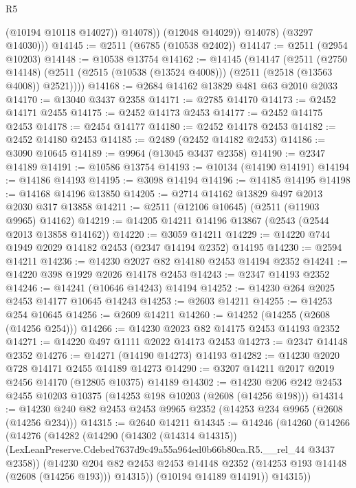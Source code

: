 \begin{lexlean}{R5}
\begin{coremodule}
                  (@10194 @10118 @14027))
                @14078))
            (@12048 @14029))
          @14078)
        (@3297 @14030)))
@14145 := @2511 (@6785 (@10538 @2402))
@14147 := @2511 (@2954 @10203)
@14148 := @10538 @13754
@14162 := @14145
    (@14147
      (@2511
        (@2750 @14148)
        (@2511 (@2515 (@10538 (@13524 @4008))) (@2511 (@2518 (@13563 @4008)) @2521))))
@14168 := @2684 @14162 @13829 @481 @63 @2010 @2033
@14170 := @13040 @3437 @2358
@14171 := @2785 @14170
@14173 := @2452 @14171 @2455
@14175 := @2452 @14173 @2453
@14177 := @2452 @14175 @2453
@14178 := @2454 @14177
@14180 := @2452 @14178 @2453
@14182 := @2452 @14180 @2453
@14185 := @2489 (@2452 @14182 @2453)
@14186 := @3090 @10645
@14189 := @9964 (@13045 @3437 @2358)
@14190 := @2347 @14189
@14191 := @10586 @13754
@14193 := @10134 (@14190 @14191)
@14194 := @14186 @14193
@14195 := @3098 @14194
@14196 := @14185 @14195
@14198 := @14168 @14196 @13850
@14205 := @2714 @14162 @13829 @497 @2013 @2030 @317 @13858
@14211 := @2511 (@12106 @10645) (@2511 (@11903 @9965) @14162)
@14219 := @14205 @14211 @14196 @13867 (@2543 (@2544 @2013 @13858 @14162))
@14220 := @3059 @14211
@14229 := @14220 @744 @1949 @2029 @14182 @2453 (@2347 @14194 @2352) @14195
@14230 := @2594 @14211
@14236 := @14230 @2027 @82 @14180 @2453 @14194 @2352
@14241 := @14220 @398 @1929 @2026 @14178 @2453
@14243 := @2347 @14193 @2352
@14246 := @14241 (@10646 @14243) @14194
@14252 := @14230 @264 @2025 @2453 @14177 @10645 @14243
@14253 := @2603 @14211
@14255 := @14253 @254 @10645
@14256 := @2609 @14211
@14260 := @14252 (@14255 (@2608 (@14256 @254)))
@14266 := @14230 @2023 @82 @14175 @2453 @14193 @2352
@14271 := @14220 @497 @1111 @2022 @14173 @2453
@14273 := @2347 @14148 @2352
@14276 := @14271 (@14190 @14273) @14193
@14282 := @14230 @2020 @728 @14171 @2455 @14189 @14273
@14290 := @3207 @14211 @2017 @2019 @2456 @14170 (@12805 @10375) @14189
@14302 := @14230 @206 @242 @2453 @2455 @10203 @10375 (@14253 @198 @10203 (@2608 (@14256 @198)))
@14314 := @14230 @240 @82 @2453 @2453 @9965 @2352 (@14253 @234 @9965 (@2608 (@14256 @234)))
@14315 := @2640 @14211
@14345 := @14246
    (@14260
      (@14266
        (@14276
          (@14282
            (@14290
              (@14302 (@14314 @14315))
              (LexLeanPreserve.Cdebed7637d9c49a55a964ed0b66b80ca.R5.__rel_44 @3437 @2358))
            (@14230
              @204
              @82
              @2453
              @2453
              @14148
              @2352
              (@14253 @193 @14148 (@2608 (@14256 @193)))
              @14315))
          (@10194 @14189 @14191))
        @14315))

\end{coremodule}
\end{lexlean}
